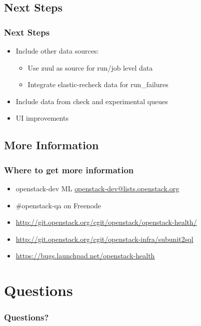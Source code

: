 \documentclass[aspectratio=169,11pt,hyperref={colorlinks=true}]{beamer}
\begin{document}
\subsection{Next Steps}
\begin{frame}
    \frametitle{Next Steps}
    \begin{itemize}
        \item Include other data sources:
            \begin{itemize}
                \item Use zuul as source for run/job level data
                \item Integrate elastic-recheck data for run\_failures
             \end{itemize}
        \item Include data from check and experimental queues
        \item UI improvements
    \end{itemize}
\end{frame}

\subsection{More Information}
\begin{frame}
\frametitle{Where to get more information}
    \begin{itemize}
        \item openstack-dev ML\: \href{mailto:openstack-dev@lists.openstack.org}{openstack-dev@lists.openstack.org}
        \item \#openstack-qa on Freenode
        \item \href{http://git.openstack.org/cgit/openstack/openstack-health/}{http://git.openstack.org/cgit/openstack/openstack-health/}
        \item \href{http://git.openstack.org/cgit/openstack-infra/subunit2sql}{http://git.openstack.org/cgit/openstack-infra/subunit2sql}
        \item \href{https://bugs.launchpad.net/openstack-health}{https://bugs.launchpad.net/openstack-health}
    \end{itemize}
\end{frame}

\section{Questions}
\begin{frame}
\frametitle{Questions?}
\end{frame}
\end{document}

